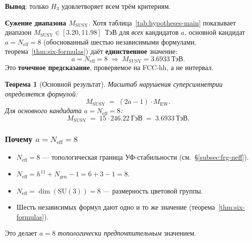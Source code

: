 \documentclass[11pt,a4paper]{article}
\newcommand{\SU}{\ensuremath{\mathrm{SU}}}
\newtheorem{theorem}{Теорема}[section]
\theoremstyle{definition}
\begin{document}
\medskip\noindent
\textbf{Вывод}: только $H_3$ удовлетворяет всем трём критериям.

\medskip\noindent
\textbf{Сужение диапазона $M_{\text{SUSY}}$}.
Хотя таблица~\ref{tab:hypotheses-main} показывает диапазон
$M_{\text{SUSY}} \in [3.20, 11.98]$~ТэВ для \emph{всех}
кандидатов $a$, основной кандидат $a = N_{\text{eff}} = 8$
(обоснованный шестью независимыми формулами,
теорема~\ref{thm:six-formulas}) даёт \textbf{единственное}
значение:
\begin{equation}
    \boxed{
    a = N_{\text{eff}} = 8
    \;\Rightarrow\;
    M_{\text{SUSY}} = 3.6933~\text{ТэВ}.
    }
    \label{eq:MSUSY-narrowed}
\end{equation}
Это \textbf{точечное предсказание}, проверяемое на FCC-hh,
а не интервал.

\begin{theorem}[Основной результат]
\label{thm:MSUSY-main}
Масштаб нарушения суперсимметрии определяется формулой:
\begin{equation}
    \boxed{
    M_{\text{SUSY}} \;=\; (2a - 1) \cdot M_{\text{EW}}.
    }
    \label{eq:MSUSY-H3}
\end{equation}
Для основного кандидата $a = N_{\text{eff}} = 8$:
\begin{equation}
    \boxed{
    M_{\text{SUSY}} \;=\; 15 \cdot 246.22~\text{ГэВ}
    \;=\; 3.6933~\text{ТэВ}.
    }
    \label{eq:MSUSY-final}
\end{equation}
\end{theorem}

\subsubsection{Почему \texorpdfstring{$a = N_{\text{eff}} = 8$}{a = N\_eff = 8}}

\begin{itemize}
    \item $N_{\text{eff}} = 8$ --- топологическая граница
          УФ-стабильности (см.~\S\ref{subsec:frg-neff}).
    \item $N_{\text{eff}} = h^{11} + N_{\text{gen}} - 1 = 6 + 3 - 1 = 8$.
    \item $N_{\text{eff}} = \dim(\SU(3)) = 8$ --- размерность
          цветовой группы.
    \item Шесть независимых формул дают одно и то же значение
          (теорема~\ref{thm:six-formulas}).
\end{itemize}

\medskip\noindent
Это делает $a = 8$ \emph{топологически предпочтительным}
значением.
\end{document}
